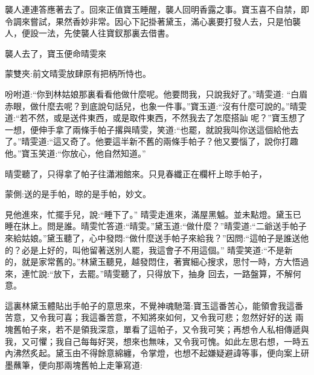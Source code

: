 \begin{parag}
    襲人連連答應著去了。回來正值寶玉睡醒，襲人回明香露之事。寶玉喜不自禁，即令調來嘗試，果然香妙非常。因心下記掛著黛玉，滿心裏要打發人去，只是怕襲人，便設一法，先使襲人往寶釵那裏去借書。
\end{parag}


\begin{parag}
    襲人去了，寶玉便命晴雯來\begin{note}蒙雙夾:前文晴雯放肆原有把柄所恃也。\end{note}吩咐道:“你到林姑娘那裏看看他做什麼呢。他要問我，只說我好了。”晴雯道: “白眉赤眼，做什麼去呢？到底說句話兒，也象一件事。”寶玉道:“沒有什麼可說的。”晴雯道:“若不然，或是送件東西，或是取件東西，不然我去了怎麼搭訕 呢？”寶玉想了一想，便伸手拿了兩條手帕子撂與晴雯，笑道:“也罷，就說我叫你送這個給他去了。”晴雯道:“這又奇了。他要這半新不舊的兩條手帕子？他又要惱了，說你打趣他。”寶玉笑道:“你放心，他自然知道。”
\end{parag}


\begin{parag}
    晴雯聽了，只得拿了帕子往瀟湘館來。只見春纖正在欄杆上晾手帕子，\begin{note}蒙側:送的是手帕，晾的是手帕，妙文。\end{note}見他進來，忙擺手兒，說:“睡下了。” 晴雯走進來，滿屋黑魆。並未點燈。黛玉已睡在牀上。問是誰。晴雯忙答道:“晴雯。”黛玉道:“做什麼？”晴雯道:“二爺送手帕子來給姑娘。”黛玉聽了，心中發悶:“做什麼送手帕子來給我？”因問:“這帕子是誰送他的？必是上好的，叫他留著送別人罷，我這會子不用這個。” 晴雯笑道:“不是新的，就是家常舊的。”林黛玉聽見，越發悶住，著實細心搜求，思忖一時，方大悟過來，連忙說:“放下，去罷。”晴雯聽了，只得放下，抽身 回去，一路盤算，不解何意。
\end{parag}


\begin{parag}
    這裏林黛玉體貼出手帕子的意思來，不覺神魂馳蕩:寶玉這番苦心，能領會我這番苦意，又令我可喜；我這番苦意，不知將來如何，又令我可悲；忽然好好的送 兩塊舊帕子來，若不是領我深意，單看了這帕子，又令我可笑；再想令人私相傳遞與我，又可懼；我自己每每好哭，想來也無味，又令我可愧。如此左思右想，一時五內沸然炙起。黛玉由不得餘意綿纏，令掌燈，也想不起嫌疑避諱等事，便向案上研墨蘸筆，便向那兩塊舊帕上走筆寫道:
\end{parag}


